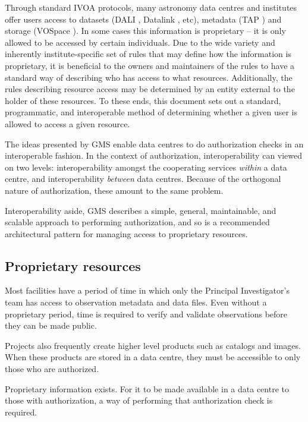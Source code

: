 \documentclass[11pt,a4paper]{ivoa}
\begin{document}
Through standard IVOA protocols, many astronomy data centres and institutes offer users access to datasets (DALI \citep{2017ivoa.spec.0517D}, Datalink \citep{2015ivoa.spec.0617D}, etc), metadata (TAP \citep{2010ivoa.spec.0327D}) and storage (VOSpace \citep{2018ivoa.spec.0621G}).  In some cases this information is proprietary -- it is only allowed to be accessed by certain individuals.  Due to the wide variety and inherently institute-specific set of rules that may define how the information is proprietary, it is beneficial to the owners and maintainers of the rules to have a standard way of describing who has access to what resources.  Additionally, the rules describing resource access may be determined by an entity external to the holder of these resources.  To these ends, this document sets out a standard, programmatic, and interoperable method of determining whether a given user is allowed to access a given resource.

The ideas presented by GMS enable data centres to do authorization checks in an interoperable fashion.  In the context of authorization, interoperability can viewed on two levels:  interoperability amongst the cooperating services \emph{within} a data centre, and interoperability \emph{between} data centres.  Because of the orthogonal nature of authorization, these amount to the same problem.

Interoperability aside, GMS describes a simple, general, maintainable, and scalable approach to performing authorization, and so is a recommended architectural pattern for managing access to proprietary resources.

\subsection{Proprietary resources}

Most facilities have a period of time in which only the Principal Investigator's team has access to observation metadata and data files.  Even without a proprietary period, time is required to verify and validate observations before they can be made public.

Projects also frequently create higher level products such as catalogs and images.  When these products are stored in a data centre, they must be accessible to only those who are authorized.

Proprietary information exists.  For it to be made available in a data centre to those with authorization, a way of performing that authorization check is required.
\end{document}
